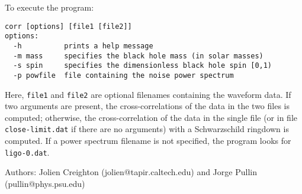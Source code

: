 To execute the program:
\begin{verbatim}
corr [options] [file1 [file2]]
options:
  -h          prints a help message
  -m mass     specifies the black hole mass (in solar masses)
  -s spin     specifies the dimensionless black hole spin [0,1)
  -p powfile  file containing the noise power spectrum
\end{verbatim}
Here, \texttt{file1} and \texttt{file2} are optional filenames containing the
waveform data.  If two arguments are present, the cross-correlations of the
data in the two files is computed; otherwise, the cross-correlation of the
data in the single file (or in file \texttt{close-limit.dat} if there are
no arguments) with a Schwarzschild ringdown is computed.  If a power spectrum
filename is not specified, the program looks for \texttt{ligo-0.dat}.

\begin{description}
\item{Authors:}  Jolien Creighton (jolien@tapir.caltech.edu)
    and Jorge Pullin (pullin@phys.psu.edu)
\end{description}
